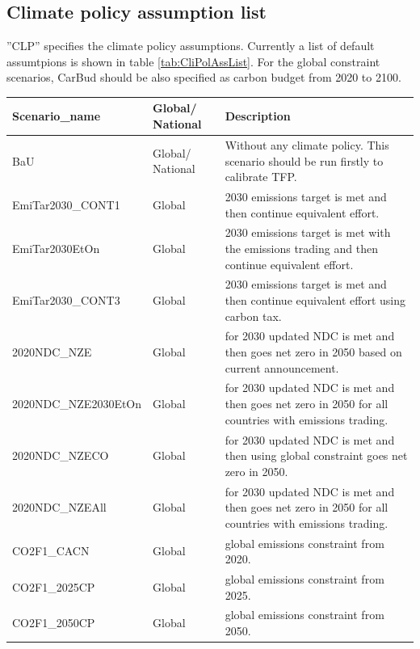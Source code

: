\documentclass[10pt,a4paper,titlepage,dvipdfmx]{book}
\begin{document}
\subsection{\label{subsec:CliPolAssLis}Climate policy assumption list}

''CLP'' specifies the climate policy assumptions. Currently a list of default assumtpions is shown in table \ref{tab:CliPolAssList}. 
For the global constraint scenarios, CarBud should be also specified as carbon budget from 2020 to 2100.


\begin{tabularx}{\textwidth}{|
p{}|
p{}|
p{}|} 
\caption{\label{tab:CliPolAssList}Climate policy assumptions list} \\
\hline 
Scenario\_name & Global/ National & Description \\\hline 
BaU & Global/ National & Without any climate policy. This scenario should be run firstly to calibrate TFP. \\\hline 
EmiTar2030\_CONT1 & Global & 2030 emissions target is met and then continue equivalent effort. \\\hline 
EmiTar2030EtOn & Global &2030 emissions target is met with the emissions trading and then continue equivalent effort. \\\hline 
EmiTar2030\_CONT3 & Global &2030 emissions target is met and then continue equivalent effort using carbon tax. \\\hline 
2020NDC\_NZE & Global &for 2030 updated NDC is met and then goes net zero in 2050 based on current announcement. \\\hline  
2020NDC\_NZE2030EtOn & Global &for 2030 updated NDC is met and then goes net zero in 2050 for all countries with emissions trading. \\\hline
2020NDC\_NZECO & Global &for 2030 updated NDC is met and then using global constraint goes net zero in 2050. \\\hline 
2020NDC\_NZEAll & Global &for 2030 updated NDC is met and then goes net zero in 2050 for all countries with emissions trading. \\\hline 
CO2F1\_CACN & Global &global emissions constraint from 2020. \\\hline  
CO2F1\_2025CP & Global &global emissions constraint from 2025. \\\hline 
CO2F1\_2050CP & Global &global emissions constraint from 2050. \\\hline 

\end{tabularx}
\end{document}
